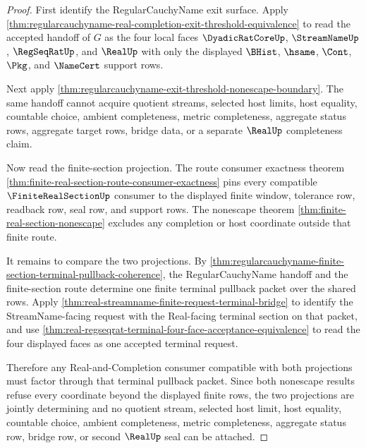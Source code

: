 \begin{proof}
First identify the RegularCauchyName exit surface. Apply \autoref{thm:regularcauchyname-real-completion-exit-threshold-equivalence} to read the accepted handoff of $G$ as the four local faces $\DyadicRatCoreUp$, $\StreamNameUp$, $\RegSeqRatUp$, and $\RealUp$ with only the displayed $\BHist$, $\hsame$, $\Cont$, $\Pkg$, and $\NameCert$ support rows.

Next apply \autoref{thm:regularcauchyname-exit-threshold-nonescape-boundary}. The same handoff cannot acquire quotient streams, selected host limits, host equality, countable choice, ambient completeness, metric completeness, aggregate status rows, aggregate target rows, bridge data, or a separate $\RealUp$ completeness claim.

Now read the finite-section projection. The route consumer exactness theorem \autoref{thm:finite-real-section-route-consumer-exactness} pins every compatible $\FiniteRealSectionUp$ consumer to the displayed finite window, tolerance row, readback row, seal row, and support rows. The nonescape theorem \autoref{thm:finite-real-section-nonescape} excludes any completion or host coordinate outside that finite route.

It remains to compare the two projections. By \autoref{thm:regularcauchyname-finite-section-terminal-pullback-coherence}, the RegularCauchyName handoff and the finite-section route determine one finite terminal pullback packet over the shared rows. Apply \autoref{thm:real-streamname-finite-request-terminal-bridge} to identify the StreamName-facing request with the Real-facing terminal section on that packet, and use \autoref{thm:real-regseqrat-terminal-four-face-acceptance-equivalence} to read the four displayed faces as one accepted terminal request.

Therefore any Real-and-Completion consumer compatible with both projections must factor through that terminal pullback packet. Since both nonescape results refuse every coordinate beyond the displayed finite rows, the two projections are jointly determining and no quotient stream, selected host limit, host equality, countable choice, ambient completeness, metric completeness, aggregate status row, bridge row, or second $\RealUp$ seal can be attached.
\end{proof}
